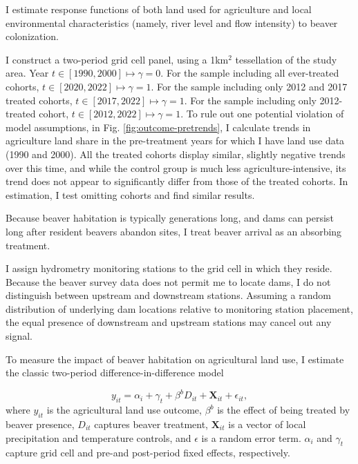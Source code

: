 I estimate response functions of both land used for agriculture and local environmental characteristics (namely, river level and flow intensity) to beaver colonization.

I construct a two-period grid cell panel, using a 1km$^2$ tessellation of the study area. Year $t \in [1990, 2000] \mapsto \gamma = 0$. For the sample including all ever-treated cohorts, $t \in [2020, 2022] \mapsto \gamma = 1$. For the sample including only 2012 and 2017 treated cohorts, $t \in [2017, 2022] \mapsto \gamma = 1$. For the sample including only 2012-treated cohort, $t \in [2012, 2022] \mapsto \gamma = 1$. To rule out one potential violation of model assumptions, in Fig. \ref{fig:outcome-pretrends}, I calculate trends in agriculture land share in the pre-treatment years for which I have land use data (1990 and 2000). All the treated cohorts display similar, slightly negative trends over this time, and while the control group is much less agriculture-intensive, its trend does not appear to significantly differ from those of the treated cohorts. In estimation, I test omitting cohorts and find similar results.

Because beaver habitation is typically generations long, and dams can persist long after resident beavers abandon sites, I treat beaver arrival as an absorbing treatment.

I assign hydrometry monitoring stations to the grid cell in which they reside. Because the beaver survey data does not permit me to locate dams, I do not distinguish between upstream and downstream stations. Assuming a random distribution of underlying dam locations relative to monitoring station placement, the equal presence of downstream and upstream stations may cancel out any signal.


To measure the impact of beaver habitation on agricultural land use, I estimate the classic two-period difference-in-difference model

\begin{equation} \label{eq:main_beaver_eq}
y_{it} = \alpha_i + \gamma_t + \beta^{b}D_{it} + \mathbf{X}_{it} + \epsilon_{it},
\end{equation}
where $y_{it}$ is the agricultural land use outcome, $\beta^b$ is the effect of being treated by beaver presence, $D_{it}$ captures beaver treatment, $\mathbf{X}_{it}$ is a vector of local precipitation and temperature controls, and $\epsilon$ is a random error term. $\alpha_i$ and $\gamma_t$ capture grid cell and pre-and post-period fixed effects, respectively. 